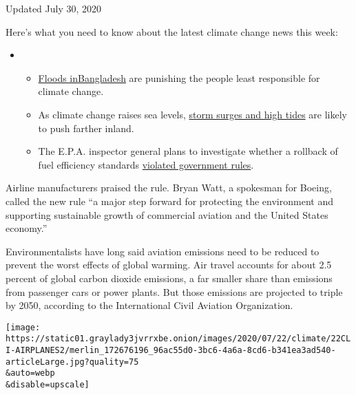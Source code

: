 Updated July 30, 2020

Here's what you need to know about the latest climate change news this
week:

\begin{itemize}
\item
  \begin{itemize}
  \tightlist
  \item
    \href{https://www.nytimes3xbfgragh.onion/2020/07/30/climate/bangladesh-floods.html?action=click\&pgtype=Article\&state=default\&region=MAIN_CONTENT_1\&context=storylines_keepup}{Floods
    in}\href{https://www.nytimes3xbfgragh.onion/2020/07/30/climate/bangladesh-floods.html?action=click\&pgtype=Article\&state=default\&region=MAIN_CONTENT_1\&context=storylines_keepup}{Bangladesh}
    are punishing the people least responsible for climate change.
  \item
    As climate change raises sea levels,
    \href{https://www.nytimes3xbfgragh.onion/2020/07/30/climate/sea-level-inland-floods.html?action=click\&pgtype=Article\&state=default\&region=MAIN_CONTENT_1\&context=storylines_keepup}{storm
    surges and high tides} are likely to push farther inland.
  \item
    The E.P.A. inspector general plans to investigate whether a rollback
    of fuel efficiency standards
    \href{https://www.nytimes3xbfgragh.onion/2020/07/27/climate/trump-fuel-efficiency-rule.html?action=click\&pgtype=Article\&state=default\&region=MAIN_CONTENT_1\&context=storylines_keepup}{violated
    government rules}.
  \end{itemize}
\end{itemize}

Airline manufacturers praised the rule. Bryan Watt, a spokesman for
Boeing, called the new rule ``a major step forward for protecting the
environment and supporting sustainable growth of commercial aviation and
the United States economy.''

Environmentalists have long said aviation emissions need to be reduced
to prevent the worst effects of global warming. Air travel accounts for
about 2.5 percent of global carbon dioxide emissions, a far smaller
share than emissions from passenger cars or power plants. But those
emissions are projected to triple by 2050, according to the
International Civil Aviation Organization.

\texttt{[image: https://static01.graylady3jvrrxbe.onion/images/2020/07/22/climate/22CLI-AIRPLANES2/merlin\_172676196\_96ac55d0-3bc6-4a6a-8cd6-b341ea3ad540-articleLarge.jpg?quality=75\\\&auto=webp\\\&disable=upscale]}

